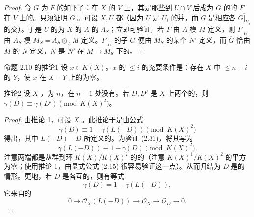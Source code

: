 \begin{proof}
令 $\overline G$ 为 $F$ 的如下子：在 $X$ 的 $V$ 上，其是那些到 $U\cap V$ 后成为 $G$ 的的 $F$ 在 $V$ 上的。只须证明 $\overline G$ 。可设 $X,U$ 都（因为 $U$ 是 $U_i$ 的并，而 $\overline G$ 是相应各 $\overline{G|_{U_i}}$ 的交）。于是 $U$ 的为 $X$ 的 $A$ 的 $A_S$；立即可验证，若 $F$ 由 $A$-模 $M$ 定义，则 $F|_U$ 由 $A_S$-模 $M_S=A_S\otimes_A M$ 定义。$F|_U$ 的子 $G$ 便由 $M_S$ 的某个 $N'$ 定义，而 $\overline G$ 恰由 $M$ 的 $N$ 定义，$N$ 是 $N'$ 在 $M\to M_S$ 下的。
\end{proof}
\begin{SGAresult}{命题 2.10 的推论}{1}
设 $x\in K(X)$。$x$ 的 $\leq i$ 的充要条件是：存在 $X$ 中 $\leq n-i$ 的 $Y$，使 $x$ 在 $X-Y$ 上的为零。
\end{SGAresult}
\begin{SGAresult}{推论}{2}
设 $X$ ，为 $n$，在 $n-1$ 处没有。若 $D,D'$ 是 $X$ 上两个的，则 $\gamma(D)\equiv\gamma(D')\pmod {K(X)^2}$。
\end{SGAresult}
\begin{proof}
由推论 1，可设 $X$ 。此推论于是由公式
\[
\gamma(D)\equiv1-\gamma(L(-D))\pmod {K(X)^2}\tag{2.31}
\]
得出，其中 $L(-D)$  $-D$ 所定义的。为验证 (2.31)，将其写为
\[
\gamma(L(-D))\equiv1-\gamma(D)\pmod {K(X)^2}.\tag{2.31 bis}
\]
注意两端都是从群到环 $K(X)/K(X)^2$ 的的（注意 $K(X)^1/K(X)^2$ 的平方为零；使用推论 1，由显式公式 (2.15) 很容易验证这一点）。从而归结为 $D$ 是的情形。更地，若 $D$ 是各互的，则有等式
\[
\gamma(D)=1-\gamma(L(-D)),\tag{2.32}
\]
它来自的
\[
0\longrightarrow\mathcal O_X(L(-D))\longrightarrow\mathcal O_X\longrightarrow\mathcal O_D\longrightarrow0.
\]
\end{proof}
